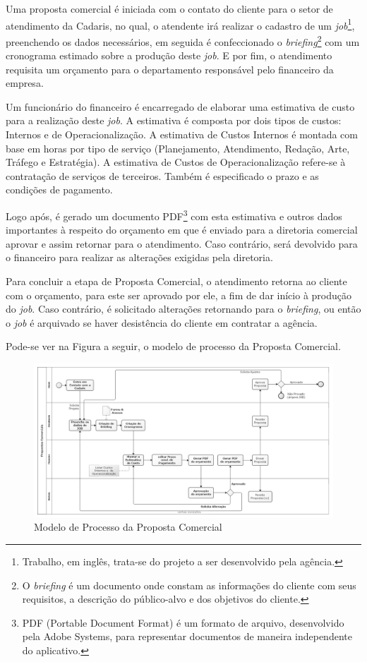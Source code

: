 \documentclass[
  12pt,				%
  openany,
  oneside,
  a4paper,			%
  english,			%
  brazil
]{article}
\numberwithin{figure}{section}
\numberwithin{table}{section}
\begin{document}
Uma proposta comercial é iniciada com o contato do cliente para o setor de atendimento da Cadaris, no qual, o atendente irá realizar o cadastro de um \textit{job}\footnote{Trabalho, em inglês, trata-se do projeto a ser desenvolvido pela agência.}, preenchendo os dados necessários, em seguida é confeccionado o \textit{briefing}\footnote{O \textit{briefing} é um documento onde constam as informações do cliente com seus requisitos, a descrição do público-alvo e dos objetivos do cliente.} com um cronograma estimado sobre a produção deste \textit{job}. E por fim, o atendimento requisita um orçamento para o departamento responsável pelo financeiro da empresa.

Um funcionário do financeiro é encarregado de elaborar uma estimativa de custo para a realização deste \textit{job}. A estimativa é composta por dois tipos de custos: Internos e de Operacionalização. A estimativa de Custos Internos é montada com base em horas por tipo de serviço (Planejamento, Atendimento, Redação, Arte, Tráfego e Estratégia). A estimativa de Custos de Operacionalização refere-se à contratação de serviços de terceiros. Também é especificado o prazo e as condições de pagamento.

Logo após, é gerado um documento PDF\footnote{PDF (Portable Document Format) é um formato de arquivo, desenvolvido pela Adobe Systems, para representar documentos de maneira independente do aplicativo.} com esta estimativa e outros dados importantes à respeito do orçamento em que é enviado para a diretoria comercial aprovar e assim retornar para o atendimento. Caso contrário, será devolvido para o financeiro para realizar as alterações exigidas pela diretoria.

Para concluir a etapa de Proposta Comercial, o atendimento retorna ao cliente com o orçamento, para este ser aprovado por ele, a fim de dar início à produção do \textit{job}. Caso contrário, é solicitado alterações retornando para o \textit{briefing}, ou então o \textit{job} é arquivado se haver desistência do cliente em contratar a agência.

Pode-se ver na Figura a seguir, o modelo de processo da Proposta Comercial.

\begin{figure}[h]
  \centering
  \includegraphics[width=\linewidth]{ModeloProcesso_Comercial_PeB}
  \caption{Modelo de Processo da Proposta Comercial}
  \label{fig:modProcess}
\end{figure}
\end{document}
